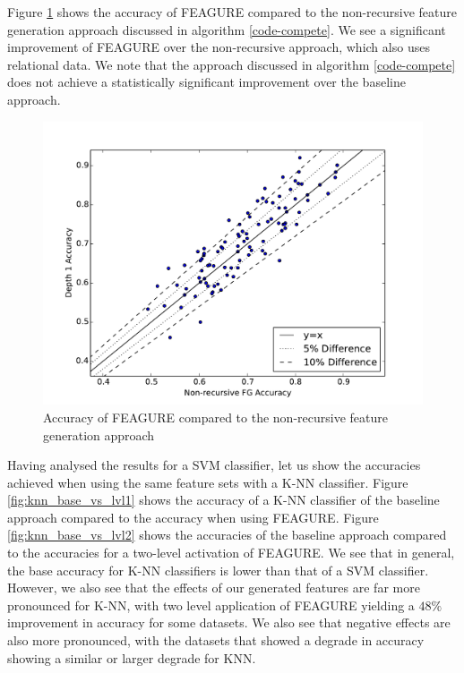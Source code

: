 \documentclass[twoside,11pt]{article}
\theoremstyle{definition}
\begin{document}
Figure \ref{fig:svm_08_compete_vs_lvl1} shows the accuracy of FEAGURE compared to the non-recursive feature generation approach discussed in algorithm \ref{code-compete}. We see a significant improvement of FEAGURE over the non-recursive approach, which also uses relational data. We note that the approach discussed in algorithm \ref{code-compete} does not achieve a statistically significant improvement over the baseline approach.

\begin{figure}
	\centering
	\includegraphics[width=0.7\linewidth]{svm_08_compete_vs_lvl1}
	\caption{Accuracy of
		FEAGURE compared to the non-recursive feature generation approach }
	\label{fig:svm_08_compete_vs_lvl1}
\end{figure}

Having analysed the results for a SVM classifier, let us show the accuracies achieved when using the same feature sets with a K-NN classifier. Figure \ref{fig:knn_base_vs_lvl1} shows the accuracy of a K-NN classifier of the baseline approach compared to the accuracy when using FEAGURE. Figure \ref{fig:knn_base_vs_lvl2} shows the accuracies of the baseline approach compared to the accuracies for a two-level activation of FEAGURE. We see that in general, the base accuracy for K-NN classifiers is lower than that of a SVM classifier. However, we also see that the effects of our generated features are far more pronounced for K-NN, with two level application of FEAGURE yielding a $48\%$ improvement in accuracy for some datasets. We also see that negative effects are also more pronounced, with the datasets that showed a degrade in accuracy showing a similar or larger degrade for KNN.
\end{document}
